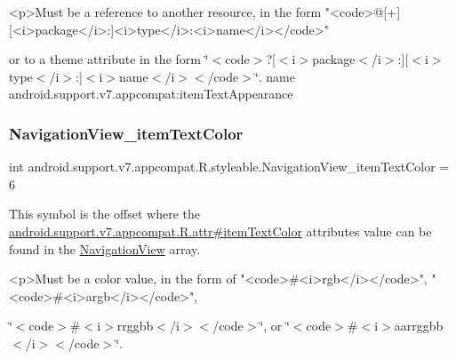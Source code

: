 \begin{DoxyVerb}      <p>Must be a reference to another resource, in the form "<code>@[+][<i>package</i>:]<i>type</i>:<i>name</i></code>"
\end{DoxyVerb}
 or to a theme attribute in the form \char`\"{}$<$code$>$?\mbox{[}$<$i$>$package$<$/i$>$\+:\mbox{]}\mbox{[}$<$i$>$type$<$/i$>$\+:\mbox{]}$<$i$>$name$<$/i$>$$<$/code$>$\char`\"{}.  name android.\+support.\+v7.\+appcompat\+:item\+Text\+Appearance \mbox{\label{classandroid_1_1support_1_1v7_1_1appcompat_1_1R_1_1styleable_a98cf51058598ae6414a496b3e7c57977}} 
\subsubsection{\texorpdfstring{Navigation\+View\+\_\+item\+Text\+Color}{NavigationView\_itemTextColor}}
{\footnotesize\ttfamily int android.\+support.\+v7.\+appcompat.\+R.\+styleable.\+Navigation\+View\+\_\+item\+Text\+Color = 6\hspace{0.3cm}{\ttfamily [static]}}

This symbol is the offset where the \hyperlink{classandroid_1_1support_1_1v7_1_1appcompat_1_1R_1_1attr_a51093d2dda63df36db5124669cff2ee0}{android.\+support.\+v7.\+appcompat.\+R.\+attr\#item\+Text\+Color} attribute\textquotesingle{}s value can be found in the \hyperlink{classandroid_1_1support_1_1v7_1_1appcompat_1_1R_1_1styleable_a52cfb3ba7bdfc8fb2cca459f35c24456}{Navigation\+View} array.

\begin{DoxyVerb}      <p>Must be a color value, in the form of "<code>#<i>rgb</i></code>", "<code>#<i>argb</i></code>",
\end{DoxyVerb}
 \char`\"{}$<$code$>$\#$<$i$>$rrggbb$<$/i$>$$<$/code$>$\char`\"{}, or \char`\"{}$<$code$>$\#$<$i$>$aarrggbb$<$/i$>$$<$/code$>$\char`\"{}. 

